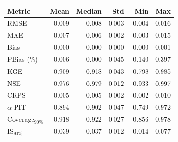 \begin{tabular}{lrrrrr}
\toprule
Metric & Mean & Median & Std & Min & Max \\
\midrule
RMSE & 0.009 & 0.008 & 0.003 & 0.004 & 0.016 \\
MAE & 0.007 & 0.006 & 0.002 & 0.003 & 0.015 \\
Bias & 0.000 & -0.000 & 0.000 & -0.000 & 0.001 \\
PBias (\%) & 0.006 & -0.000 & 0.045 & -0.140 & 0.397 \\
KGE & 0.909 & 0.918 & 0.043 & 0.798 & 0.985 \\
NSE & 0.976 & 0.979 & 0.012 & 0.933 & 0.997 \\
CRPS & 0.005 & 0.005 & 0.002 & 0.002 & 0.010 \\
$\alpha$-PIT & 0.894 & 0.902 & 0.047 & 0.749 & 0.972 \\
Coverage$_{90\%}$ & 0.918 & 0.922 & 0.027 & 0.856 & 0.978 \\
IS$_{90\%}$ & 0.039 & 0.037 & 0.012 & 0.014 & 0.077 \\
\bottomrule
\end{tabular}